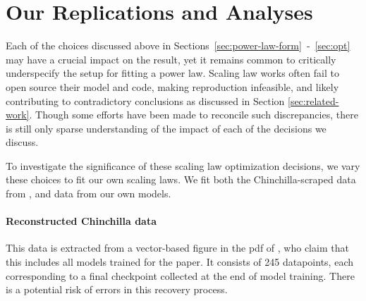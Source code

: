 

\section{Our Replications and Analyses}\label{sec:own-repl}

% 


Each of the choices discussed above in Sections~\ref{sec:power-law-form}~-~\ref{sec:opt} may have a crucial impact on the result, yet it remains common to critically underspecify the setup for fitting a power law. Scaling law works often fail to open source their model and code, making reproduction infeasible, and likely contributing to contradictory conclusions as discussed in Section \ref{sec:related-work}. Though some efforts have been made  \citep{porian2024resolving,besiroglu2024chinchilla} to reconcile such discrepancies, there is still only sparse understanding of the impact of each of the decisions we discuss.

To investigate the significance of these scaling law optimization decisions, we vary these choices to fit our own scaling laws. We fit both the Chinchilla-scraped data from \citet{besiroglu2024chinchilla}, and data from our own models.




\paragraph{Reconstructed Chinchilla data \citep{besiroglu2024chinchilla}}
This data is extracted from a vector-based figure in the pdf of \citet{hoffmann2022training}, who claim that this includes all models trained for the paper. It consists of 245 datapoints, each corresponding to a final checkpoint collected at the end of model training. There is a potential risk of errors in this recovery process. 


